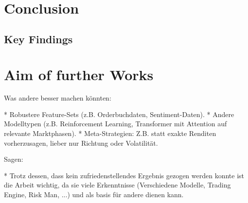 \section{Conclusion}

\subsection{Key Findings}


\section{Aim of further Works}


Was andere besser machen könnten:

* Robustere Feature-Sets (z.B. Orderbuchdaten, Sentiment-Daten).
* Andere Modelltypen (z.B. Reinforcement Learning, Transformer mit Attention auf relevante Marktphasen).
* Meta-Strategien: Z.B. statt exakte Renditen vorherzusagen, lieber nur Richtung oder Volatilität.


Sagen:

* Trotz dessen, dass kein zufriedenstellendes Ergebnis gezogen werden konnte ist die Arbeit wichtig, da sie viele Erkenntnisse (Verschiedene Modelle, Trading Engine, Risk Man, ...) und als basis für andere dienen kann.


